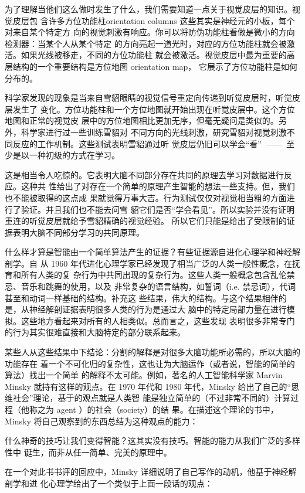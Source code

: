 为了理解当他们这么做时发生了什么，我们需要知道一点关于视觉皮层的知识。视觉皮层包
含许多方位功能柱orientation columns 这些其实是神经元的小板，每个对来自某个特定方
向的视觉刺激有响应。你可以将防伪功能柱看做是微小的方向检测器：当某个人从某个特定
的方向亮起一道光时，对应的方位功能柱就会被激活。如果光线被移走，不同的方位功能柱
就会被激活。视觉皮层中最为重要的高层结构的一个重要结构是方位地图 orientation map，
它展示了方位功能柱是如何分布的。

科学家发现的现象是当来自雪貂眼睛的视觉信号重定向传递到听觉皮层时，听觉皮层发生了
变化。方位功能柱和一个方位地图就开始出现在听觉皮层中。这个方位地图和正常的视觉皮
层中的方位地图相比更加无序，但毫无疑问是类似的。另外，科学家进行过一些训练雪貂对
不同方向的光线刺激，研究雪貂对视觉刺激不同反应的工作机制。这些测试表明雪貂通过听
觉皮层仍旧可以学会“看”~——~至少是以一种初级的方式在学习。

这是相当令人吃惊的。它表明大脑不同部分存在共同的原理去学习对数据进行反应。这种共
性给出了对存在一个简单的原理产生智能的想法一些支持。但，我们也不能被取得的这点成
果就觉得万事大吉。行为测试仅仅对视觉相当粗的方面进行了验证。并且我们也不能去问雪
貂它们是否“学会看见”。所以实验并没有证明重连的听觉皮层就给予雪貂精确的视觉经验。
所以它们只能是给出了受限制的证据表明大脑不同部分学习的共同原理。

什么样才算是智能由一个简单算法产生的证据？有些证据源自进化心理学和神经解剖学。自
从 1960 年代进化心理学家已经发现了相当广泛的人类一般性概念，在抚育和所有人类的复
杂行为中共同出现的复杂行为。这些人类一般概念包含乱伦禁忌、音乐和跳舞的使用，以及
非常复杂的语言结构，如誓词（i.e. 禁忌词），代词甚至和动词一样基础的结构。补充这
些结果，伟大的结构。与这个结果相伴的是，从神经解剖证据表明很多人类的行为是通过大
脑中的特定局部力量在进行模拟。这些地方看起来对所有的人相类似。总而言之，这些发现
表明很多非常专门的行为其实很难直接和大脑特定的部分联系起来。

某些人从这些结果中下结论：分割的解释是对很多大脑功能所必需的，所以大脑的功能存在
着一个不可化归的复杂性，这也让为大脑运作（或者说，智能的简单的算法）找出一个简单
的解释不太可能。例如，著名的人工智能科学家 Marvin Minsky 就持有这样的观点。在
1970 年代和 1980 年代，Minsky 给出了自己的“思维社会”理论，基于的观点就是人类智
能是独立简单的（不过非常不同的）计算过程（他称之为 agent ）的社会（society）的结
果。在描述这个理论的书中，Minsky 将自己观察到的东西总结为这种观点的能力：

    什么神奇的技巧让我们变得智能？这其实没有技巧。智能的能力从我们广泛的多样性中
    诞生，而非从任一简单、完美的原理中。

在一个对此书书评的回应中，Minsky 详细说明了自己写作的动机，他基于神经解剖学和进
化心理学给出了一个类似于上面一段话的观点：

